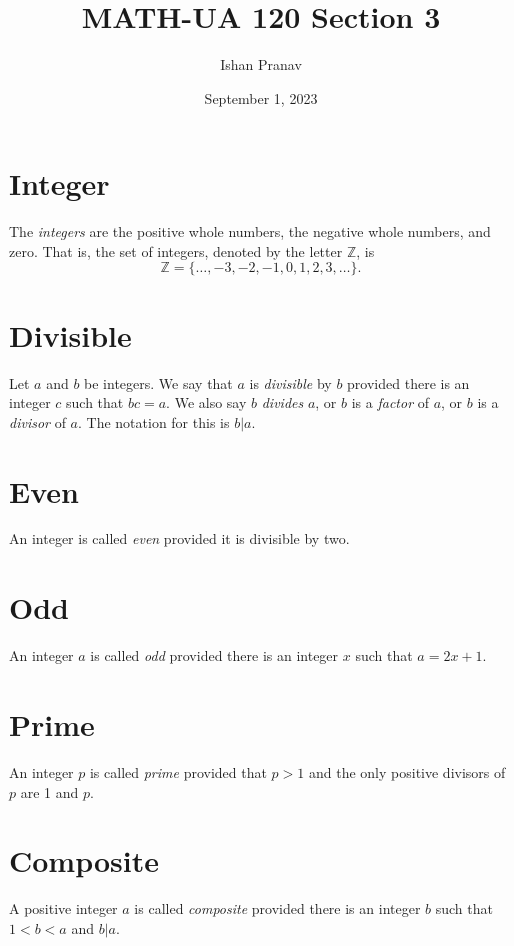 \documentclass[12pt]{article}
\title{MATH-UA 120 Section 3}
\author{Ishan Pranav}
\date{September 1, 2023}
\begin{document}
\maketitle
\section*{Integer}
The \textit{integers} are the positive whole numbers, the negative whole numbers, and zero. That is, the set of integers, denoted by the letter $\mathbb{Z}$, is
\[\mathbb{Z}=\{\dots,-3,-2,-1,0,1,2,3,\dots\}.\]
\section*{Divisible}
Let $a$ and $b$ be integers. We say that $a$ is \textit{divisible} by $b$ provided there is an integer $c$ such that $bc=a$. We also say $b$ \textit{divides} $a$, or $b$ is a \textit{factor} of $a$, or $b$ is a \textit{divisor} of $a$. The notation for this is $b|a$.
\section*{Even}
An integer is called \textit{even} provided it is divisible by two.
\section*{Odd}
An integer $a$ is called \textit{odd} provided there is an integer $x$ such that $a=2x+1$.
\section*{Prime}
An integer $p$ is called \textit{prime} provided that $p>1$ and the only positive divisors of $p$ are 1 and $p$.
\section*{Composite}
A positive integer $a$ is called \textit{composite} provided there is an integer $b$ such that $1<b<a$ and $b|a$.
\end{document}
